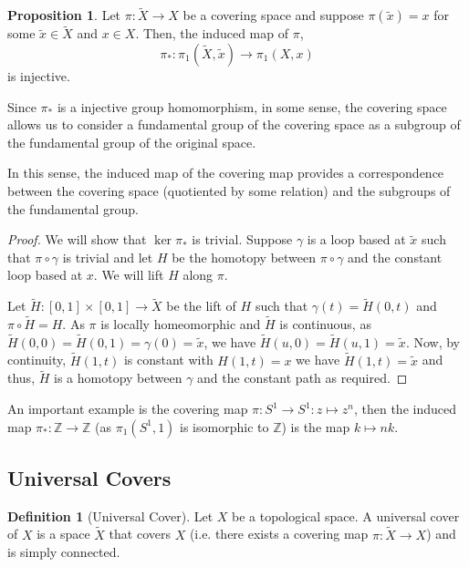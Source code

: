 \documentclass[]{article}
\theoremstyle{definition}
\theoremstyle{definition}
\newtheorem{definition}{Definition}[section]
\newtheorem{proposition}{Proposition}[section]
\begin{document}
\begin{proposition}
  Let \(\pi : \tilde X \to X\) be a covering space and suppose \(\pi(\tilde x) = x\) 
  for some \(\tilde x \in \tilde X\) and \(x \in X\). Then, the induced map of \(\pi\),
  \[\pi_* : \pi_1(\tilde X, \tilde x) \to \pi_1(X, x)\]
  is injective.

  Since \(\pi_*\) is a injective group homomorphism, in some sense, the covering 
  space allows us to consider a fundamental group of the covering space as a subgroup 
  of the fundamental group of the original space.

  In this sense, the induced map of the covering map provides a correspondence 
  between the covering space (quotiented by some relation) and the subgroups of the 
  fundamental group.
\end{proposition}
\begin{proof}
  We will show that \(\ker \pi_*\) is trivial. Suppose \(\gamma\) is a loop based at 
  \(\tilde x\) such that \(\pi \circ \gamma\) is trivial and let \(H\) be the 
  homotopy between \(\pi \circ \gamma\) and the constant loop based at \(x\). 
  We will lift \(H\) along \(\pi\). 

  Let \(\tilde H : [0, 1] \times [0, 1] \to \tilde X\) be the lift of \(H\) such that 
  \(\gamma(t) = \tilde H(0, t)\) and \(\pi \circ \tilde H = H\). As \(\pi\) is locally 
  homeomorphic and \(\tilde H\) is continuous, as
  \(\tilde H(0, 0) = \tilde H(0, 1) = \gamma(0) = \tilde x\), we have 
  \(\tilde H(u, 0) = \tilde H(u, 1) = \tilde x\). Now, by continuity, \(\tilde H(1, t)\) 
  is constant with \(H(1, t) = x\) we have \(\tilde H(1, t) = \tilde x\) and thus, 
  \(\tilde H\) is a homotopy between \(\gamma\) and the constant path as required. 
\end{proof}

An important example is the covering map \(\pi : S^1 \to S^1 : z \mapsto z^n\), 
then the induced map \(\pi_* : \mathbb{Z} \to \mathbb{Z}\) (as \(\pi_1(S^1, 1)\) 
is isomorphic to \(\mathbb{Z}\)) is the map \(k \mapsto nk\). 

\subsection{Universal Covers}

\begin{definition}[Universal Cover]
  Let \(X\) be a topological space. A universal cover of \(X\) is a space \(\tilde X\) 
  that covers \(X\) (i.e. there exists a covering map \(\pi : \tilde X \to X\)) and 
  is simply connected.
\end{definition}
\end{document}
